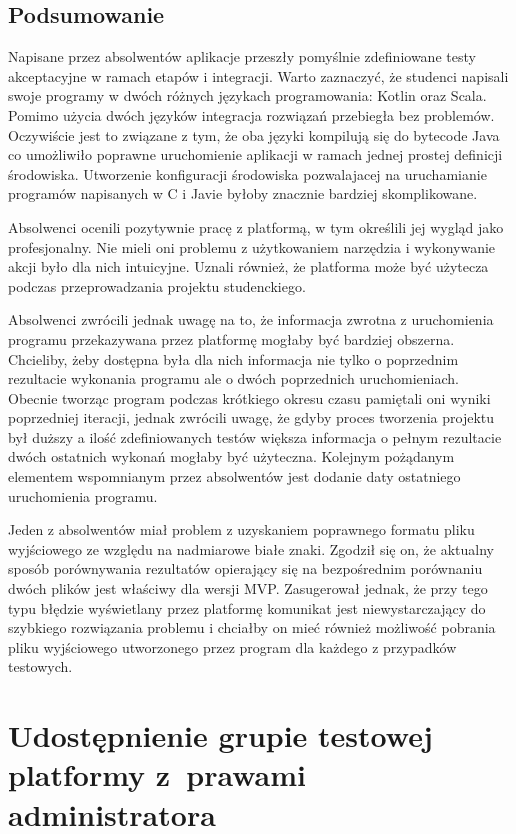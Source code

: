 \subsection{Podsumowanie}

Napisane przez absolwentów aplikacje przeszły pomyślnie zdefiniowane testy akceptacyjne w ramach etapów i integracji.
Warto zaznaczyć, że studenci napisali swoje programy w dwóch różnych językach programowania: Kotlin oraz Scala.
Pomimo użycia dwóch języków integracja rozwiązań przebiegła bez problemów.
Oczywiście jest to związane z tym, że oba języki kompilują się do bytecode Java co umożliwiło poprawne uruchomienie aplikacji w ramach jednej prostej definicji środowiska.
Utworzenie konfiguracji środowiska pozwalajacej na uruchamianie programów napisanych w C i Javie byłoby znacznie bardziej skomplikowane.

Absolwenci ocenili pozytywnie pracę z platformą, w tym określili jej wygląd jako profesjonalny.
Nie mieli oni problemu z użytkowaniem narzędzia i wykonywanie akcji było dla nich intuicyjne.
Uznali również, że platforma może być użytecza podczas przeprowadzania projektu studenckiego.

Absolwenci zwrócili jednak uwagę na to, że informacja zwrotna z uruchomienia programu przekazywana przez platformę mogłaby być bardziej obszerna.
Chcieliby, żeby dostępna była dla nich informacja nie tylko o poprzednim rezultacie wykonania programu ale o dwóch poprzednich uruchomieniach.
Obecnie tworząc program podczas krótkiego okresu czasu pamiętali oni wyniki poprzedniej iteracji, jednak zwrócili uwagę, że gdyby proces tworzenia projektu był duższy a ilość zdefiniowanych testów większa informacja o pełnym rezultacie dwóch ostatnich wykonań mogłaby być użyteczna.
Kolejnym pożądanym elementem wspomnianym przez absolwentów jest dodanie daty ostatniego uruchomienia programu.

Jeden z absolwentów miał problem z uzyskaniem poprawnego formatu pliku wyjściowego ze względu na nadmiarowe białe znaki.
Zgodził się on, że aktualny sposób porównywania rezultatów opierający się na bezpośrednim porównaniu dwóch plików jest właściwy dla wersji MVP.
Zasugerował jednak, że przy tego typu błędzie wyświetlany przez platformę komunikat jest niewystarczający do szybkiego rozwiązania problemu i chciałby on mieć również możliwość pobrania pliku wyjściowego utworzonego przez program dla każdego z przypadków testowych.


\section{Udostępnienie grupie testowej platformy z~prawami administratora}

